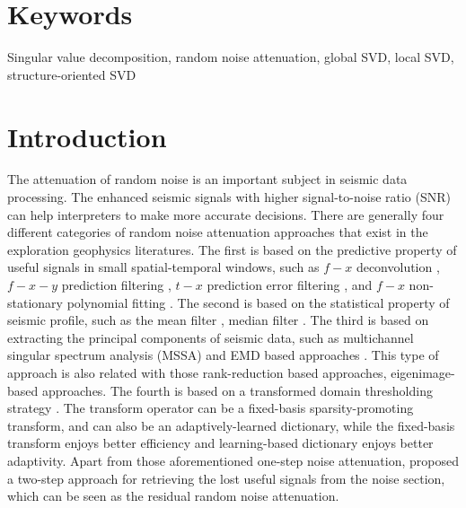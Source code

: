 \section{Keywords}
Singular value decomposition, random noise attenuation, global SVD, local SVD, structure-oriented SVD

\section{Introduction}
The attenuation of random noise is an important subject in seismic data processing. The enhanced seismic signals with higher signal-to-noise ratio (SNR) can help interpreters to make more accurate decisions. There are generally four different categories of random noise attenuation approaches that exist in the exploration geophysics literatures. The first is based on the predictive property of useful signals in small spatial-temporal windows, such as $f-x$ deconvolution \cite[]{canales,yangkang2014}, $f-x-y$ prediction filtering \cite[]{yanghua1999,yanghua2002}, $t-x$ prediction error filtering \cite[]{abma1995}, and $f-x$ non-stationary polynomial fitting \cite[]{guochang20112}.   The second is based on the statistical property of seismic profile, such as the mean filter \cite[]{nlm}, median filter \cite[]{yike2013,yangkang2014svmf,yangkang2014nmo}. The third is based on extracting the principal components of seismic data, such as multichannel singular spectrum analysis (MSSA) \cite[]{mssa,yangkang2015} and EMD based approaches \cite[]{yangkang2014emdsum}. This type of approach is also related with those rank-reduction based approaches, eigenimage-based approaches. The fourth is based on a transformed domain thresholding strategy \cite[]{curvelet,seislet,yangkang20142}. The transform operator can be a fixed-basis sparsity-promoting transform, and can also be an adaptively-learned dictionary, while the fixed-basis transform enjoys better efficiency and learning-based dictionary enjoys better adaptivity. Apart from those aforementioned one-step noise attenuation, \cite{yangkang2015ortho} proposed a two-step approach for retrieving the lost useful signals from the noise section, which can be seen as the residual random noise attenuation. 


